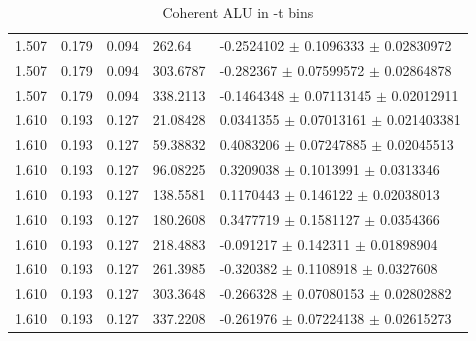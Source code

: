 \begin{table}[!h]
\begin{center}
\begin{tabular}{||l|l|l|l|l||}
           1.507 & 0.179 & 0.094 &  262.64     & -0.2524102  $\pm$  0.1096333    $\pm$  0.02830972      \\
           1.507 & 0.179 & 0.094 &  303.6787   & -0.282367   $\pm$  0.07599572   $\pm$  0.02864878      \\
           1.507 & 0.179 & 0.094 &  338.2113   & -0.1464348  $\pm$  0.07113145   $\pm$  0.02012911      \\
         \hline                                                                       
           1.610 & 0.193 & 0.127 &  21.08428   & 0.0341355   $\pm$  0.07013161   $\pm$   0.021403381     \\
           1.610 & 0.193 & 0.127 &  59.38832   & 0.4083206   $\pm$  0.07247885   $\pm$   0.02045513      \\
           1.610 & 0.193 & 0.127 &  96.08225   & 0.3209038   $\pm$  0.1013991    $\pm$   0.0313346       \\
           1.610 & 0.193 & 0.127 &  138.5581   & 0.1170443   $\pm$  0.146122     $\pm$   0.02038013      \\
           1.610 & 0.193 & 0.127 &  180.2608   & 0.3477719   $\pm$  0.1581127    $\pm$   0.0354366       \\
           1.610 & 0.193 & 0.127 &  218.4883   & -0.091217   $\pm$  0.142311     $\pm$   0.01898904      \\
           1.610 & 0.193 & 0.127 &  261.3985   & -0.320382   $\pm$  0.1108918    $\pm$   0.0327608       \\
           1.610 & 0.193 & 0.127 &  303.3648   & -0.266328   $\pm$  0.07080153   $\pm$   0.02802882      \\
           1.610 & 0.193 & 0.127 &  337.2208   & -0.261976   $\pm$  0.07224138   $\pm$   0.02615273      \\
         \hline
         \hline
      \end{tabular}
      \caption{Coherent ALU in -t bins}
      \label{table:Coh_t_BSA}
   \end{center}
\end{table}


